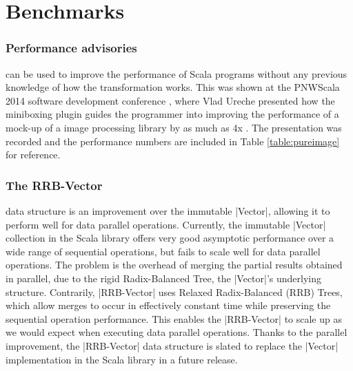 

\section{Benchmarks}
\label{sec:bench}


\subsubsection{Performance advisories} can be used to improve the performance of Scala programs without any previous knowledge of how the transformation works. This was shown at the PNWScala 2014 software development conference \cite{pnwscala-conf}, where Vlad Ureche presented how the miniboxing plugin guides the programmer into improving the performance of a mock-up of a image processing library by as much as 4x \cite{pnwscala-pureimage}. The presentation was recorded and the performance numbers are included in Table \ref{table:pureimage} for reference.

\subsubsection{The RRB-Vector} data structure \cite{rrb-vector-paper} \cite{nicolas-thesis} is an improvement over the immutable |Vector|, allowing it to perform well for data parallel operations. Currently, the immutable |Vector| collection in the Scala library offers very good asymptotic performance over a wide range of sequential operations, but fails to scale well for data parallel operations. The problem is the overhead of merging the partial results obtained in parallel, due to the rigid Radix-Balanced Tree, the |Vector|'s underlying structure. Contrarily, |RRB-Vector| uses Relaxed Radix-Balanced (RRB) Trees, which allow merges to occur in effectively constant time while preserving the sequential operation performance. This enables the |RRB-Vector| to scale up as we would expect when executing data parallel operations. Thanks to the parallel improvement, the |RRB-Vector| data structure is slated to replace the |Vector| implementation in the Scala library in a future release.

